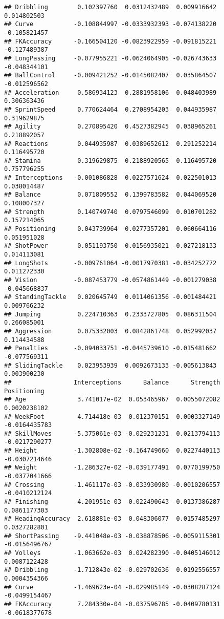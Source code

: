 \documentclass[
]{article}
\begin{document}
\begin{verbatim}
## Dribbling        0.102397760  0.0312432489  0.009916642  0.014802503
## Curve           -0.108844997 -0.0333932393 -0.074138220 -0.105821457
## FKAccuracy      -0.166504120 -0.0823922959 -0.091815221 -0.127489387
## LongPassing     -0.077955221 -0.0624064905 -0.026743633 -0.048344101
## BallControl     -0.009421252 -0.0145082407  0.035864507 -0.012596562
## Acceleration     0.586934123  0.2881958106  0.048403989  0.306363436
## SprintSpeed      0.770624464  0.2708954203  0.044935987  0.319629875
## Agility          0.270895420  0.4527382945  0.038965261  0.218892057
## Reactions        0.044935987  0.0389652612  0.291252214  0.116495720
## Stamina          0.319629875  0.2188920565  0.116495720  0.757796255
## Interceptions   -0.001086828  0.0227571624  0.022501013  0.038014487
## Balance          0.071809552  0.1399783582  0.044069520  0.108007327
## Strength         0.140749740  0.0797546099  0.010701282  0.157214065
## Positioning      0.043739964  0.0277357201  0.060664116  0.051951028
## ShotPower        0.051193750  0.0156935021 -0.027218133  0.014113081
## LongShots       -0.009761064 -0.0017970381 -0.034252772  0.011272330
## Vision          -0.087453779 -0.0574861449 -0.001279038 -0.045668837
## StandingTackle   0.020645749  0.0114061356 -0.001484421  0.009766232
## Jumping          0.224710363  0.2333727805  0.086311504  0.266085001
## Aggression       0.075332003  0.0842861748  0.052992037  0.114434588
## Penalties       -0.094033751 -0.0445739610 -0.015481662 -0.077569311
## SlidingTackle    0.023953939  0.0092673133 -0.005613843  0.003900230
##                 Interceptions      Balance      Strength   Positioning
## Age              3.741017e-02  0.053465967  0.0055072082  0.0020238102
## WeekFoot         4.714418e-03  0.012370151  0.0003327149 -0.0164435783
## SkillMoves      -5.375061e-03 -0.029231231  0.0213794113 -0.0217290277
## Height          -1.302808e-02 -0.164749660  0.0227440113 -0.0307214646
## Weight          -1.286327e-02 -0.039177491  0.0770199750 -0.0377041666
## Crossing        -1.461117e-03 -0.033930980 -0.0010206557 -0.0410212124
## Finishing       -4.201951e-03  0.022490643 -0.0137386287  0.0861177303
## HeadingAccuracy  2.618881e-03  0.048306077  0.0157485297  0.0327282801
## ShortPassing    -9.441048e-03 -0.038878506 -0.0059115301 -0.0156496767
## Volleys         -1.063662e-03  0.024282390 -0.0405146012  0.0087122428
## Dribbling       -1.712843e-02 -0.029702636  0.0192556557  0.0004354366
## Curve           -1.469623e-04 -0.029985149 -0.0308287124 -0.0499154467
## FKAccuracy       7.284330e-04 -0.037596785 -0.0409780131 -0.0618377678

\end{verbatim}
\end{document}
